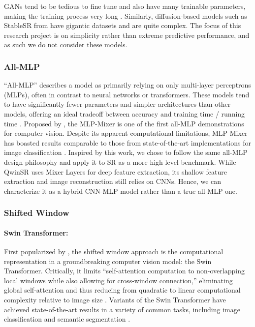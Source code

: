 \documentclass{article}
\begin{document}
GANs tend to be tedious to fine tune and also have many trainable parameters, making the training process very long \citep{SRGAN}. Similarly, diffusion-based models such as StableSR from \citet{StableSR} have gigantic datasets and are quite complex. The focus of this research project is on simplicity rather than extreme predictive performance, and as such we do not consider these models.

\subsubsection{All-MLP}

“All-MLP” describes a model as primarily relying on only multi-layer perceptrons (MLPs), often in contrast to neural networks or transformers. These models tend to have significantly fewer parameters and simpler architectures than other models, offering an ideal tradeoff between accuracy and training time / running time \citep{SwinTransformer,MLPMixer}. Proposed by \citet{MLPMixer}, the MLP-Mixer is one of the first all-MLP demonstrations for computer vision. Despite its apparent computational limitations, MLP-Mixer has boasted results comparable to those from state-of-the-art implementations for image classification \citep{MLPMixer}. Inspired by this work, we chose to follow the same all-MLP design philosophy and apply it to SR as a more high level benchmark. While QwinSR uses Mixer Layers for deep feature extraction, its shallow feature extraction and image reconstruction still relies on CNNs. Hence, we can characterize it as a hybrid CNN-MLP model rather than a true all-MLP one.

\subsubsection{Shifted Window}

\paragraph{Swin Transformer:} First popularized by \citet{SwinTransformer}, the shifted window approach is the computational representation in a groundbreaking computer vision model: the Swin Transformer. Critically, it limits “self-attention computation to non-overlapping local windows while also allowing for cross-window connection,” eliminating global self-attention and thus reducing from quadratic to linear computational complexity relative to image size \citep{SwinTransformer}. Variants of the Swin Transformer have achieved state-of-the-art results in a variety of common tasks, including image classification and semantic segmentation \citep{SwinIR, SwinSeg}.
\end{document}
